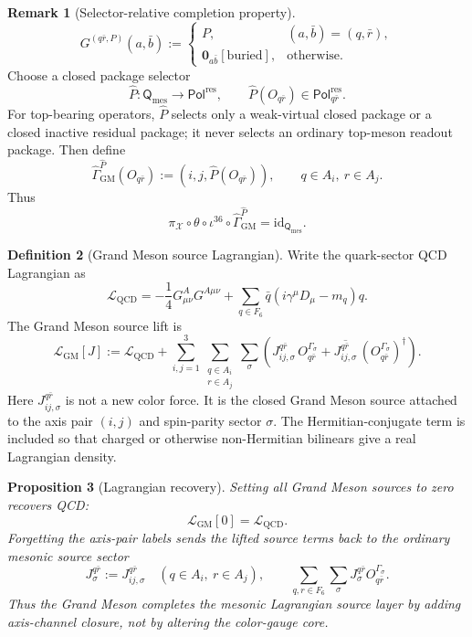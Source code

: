 \documentclass[11pt]{article}
\theoremstyle{definition}
\newtheorem{definition}{Definition}
\newtheorem{remark}[definition]{Remark}
\theoremstyle{plain}
\newtheorem{proposition}[definition]{Proposition}
\begin{document}
\begin{remark}[Selector-relative completion property]
\[
  G^{(q\bar r,P)}(a,\bar b)
  :=
  \begin{cases}
    P, & (a,\bar b)=(q,\bar r),\\
    \mathbf 0_{a\bar b}[\mathrm{buried}], & \text{otherwise}.
  \end{cases}
\]
Choose a closed package selector
\[
  \widehat P:\mathsf Q_{\mathrm{mes}}\to\mathsf{Pol}^{\mathrm{res}},
  \qquad
  \widehat P(O_{q\bar r})\in\mathsf{Pol}^{\mathrm{res}}_{q\bar r}.
\]
For top-bearing operators, \(\widehat P\) selects only a weak-virtual closed
package or a closed inactive residual package; it never selects an ordinary
top-meson readout package.
Then define
\[
  \widehat{\Gamma}^{\widehat P}_{\mathrm{GM}}(O_{q\bar r})
  :=
  (i,j,\widehat P(O_{q\bar r})),
  \qquad q\in A_i,\ r\in A_j.
\]
Thus
\[
  \pi_{\mathcal X}\circ\theta\circ
  \iota^{36}\circ\widehat{\Gamma}^{\widehat P}_{\mathrm{GM}}
  =
  \mathrm{id}_{\mathsf Q_{\mathrm{mes}}}.
\]
\end{remark}

\begin{definition}[Grand Meson source Lagrangian]
Write the quark-sector QCD Lagrangian as
\[
  \mathcal L_{\mathrm{QCD}}
  =
  -\frac14G^A_{\mu\nu}G^{A\mu\nu}
  +
  \sum_{q\in F_6}\bar q(i\gamma^\mu D_\mu-m_q)q .
\]
The Grand Meson source lift is
\[
  \mathcal L_{\mathrm{GM}}[J]
  :=
  \mathcal L_{\mathrm{QCD}}
  +
  \sum_{i,j=1}^{3}
  \sum_{\substack{q\in A_i\\ r\in A_j}}
  \sum_{\sigma}
  \left(
    J_{ij,\sigma}^{q\bar r}\,O^{\Gamma_\sigma}_{q\bar r}
    +
    \overline{J_{ij,\sigma}^{q\bar r}}\,
    (O^{\Gamma_\sigma}_{q\bar r})^\dagger
  \right).
\]
Here \(J_{ij,\sigma}^{q\bar r}\) is not a new color force.  It is the
closed Grand Meson source attached to the axis pair \((i,j)\) and
spin-parity sector \(\sigma\).  The Hermitian-conjugate term is included
so that charged or otherwise non-Hermitian bilinears give a real
Lagrangian density.
\end{definition}

\begin{proposition}[Lagrangian recovery]
Setting all Grand Meson sources to zero recovers QCD:
\[
  \mathcal L_{\mathrm{GM}}[0]=\mathcal L_{\mathrm{QCD}}.
\]
Forgetting the axis-pair labels sends the lifted source terms back to the
ordinary mesonic source sector
\[
  J_{\sigma}^{q\bar r}:=J_{ij,\sigma}^{q\bar r}
  \quad(q\in A_i,\ r\in A_j),
  \qquad
  \sum_{q,r\in F_6}\sum_{\sigma}
  J_{\sigma}^{q\bar r}O^{\Gamma_\sigma}_{q\bar r}.
\]
Thus the Grand Meson completes the mesonic Lagrangian source layer by
adding axis-channel closure, not by altering the color-gauge core.
\end{proposition}
\end{document}
